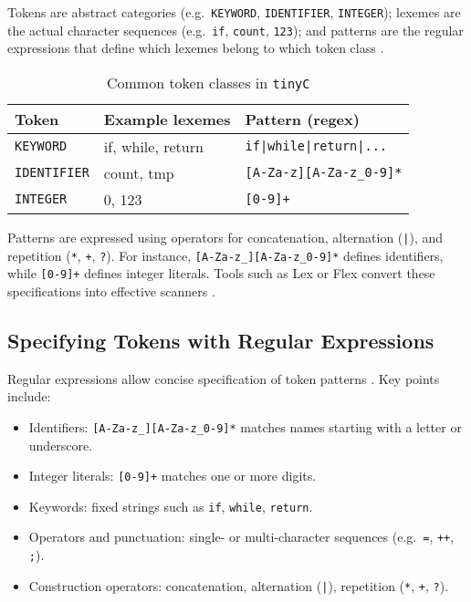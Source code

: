Tokens are abstract categories (e.g.\ \texttt{KEYWORD}, \texttt{IDENTIFIER}, \texttt{INTEGER}); lexemes are the actual character sequences (e.g.\ \texttt{if}, \texttt{count}, \texttt{123}); and patterns are the regular expressions that define which lexemes belong to which token class \cite{aho2007compilers}.

\begin{table}[ht]
\centering
\begin{tabular}{lll}
\hline
Token             & Example lexemes      & Pattern (regex)                       \\
\hline
\texttt{KEYWORD}    & if, while, return    & \texttt{if|while|return|...}          \\
\texttt{IDENTIFIER} & count, tmp          & \texttt{[A-Za-z][A-Za-z_0-9]*}       \\
\texttt{INTEGER}    & 0, 123               & \texttt{[0-9]+}                       \\
\hline
\end{tabular}
\caption{Common token classes in \texttt{tinyC}}
\label{tab:lex-tokens}
\end{table}

Patterns are expressed using operators for concatenation, alternation (\texttt{|}), and repetition (\texttt{*}, \texttt{+}, \texttt{?}). For instance, \texttt{[A-Za-z_][A-Za-z_0-9]*} defines identifiers, while \texttt{[0-9]+} defines integer literals. Tools such as Lex or Flex convert these specifications into effective scanners \cite{aho2007compilers}.



\subsection{Specifying Tokens with Regular Expressions}

Regular expressions allow concise specification of token patterns \cite{aho2007compilers}. Key points include:
\begin{itemize}
  \item Identifiers: \texttt{[A-Za-z\_][A-Za-z\_0-9]*} matches names starting with a letter or underscore.
  \item Integer literals: \texttt{[0-9]+} matches one or more digits.
  \item Keywords: fixed strings such as \texttt{if}, \texttt{while}, \texttt{return}.
  \item Operators and punctuation: single- or multi-character sequences (e.g.\ \texttt{=}, \texttt{++}, \texttt{;}).
  \item Construction operators: concatenation, alternation (\texttt{|}), repetition (\texttt{*}, \texttt{+}, \texttt{?}).
\end{itemize}

